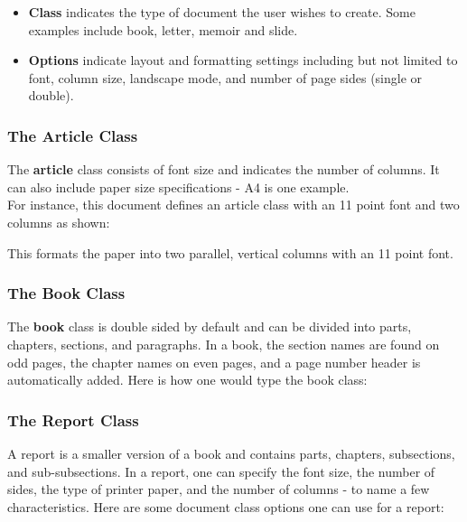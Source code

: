 \documentclass[11pt,twocolumn]{article}
\begin{document}
\begin{itemize}
    \item \textbf{Class} indicates the type of document the user wishes to create. Some examples include book, letter, memoir and slide.
    \item \textbf{Options} indicate layout and formatting settings including but not limited to font, column size, landscape mode, and number of page sides (single or double). 
\end{itemize}

\subsubsection{The Article Class}
The \textbf{article} class consists of font size and indicates the number of columns. It can also include paper size specifications - A4 is one example.~\cite{latexmanual} \\For instance, this document defines an article class with an 11 point font and two columns as shown:

\thinspace
{}
\thinspace

This formats the paper into two parallel, vertical columns with an 11 point font. 

\subsubsection{The Book Class}
The \textbf{book} class is double sided by default and can be divided into parts, chapters, sections, and paragraphs. In a book, the section names are found on odd pages, the chapter names on even pages, and a page number header is automatically added.  
Here is how one would type the book class:

\thinspace
{}
\thinspace

\subsubsection{The Report Class}
A report is a smaller version of a book and contains parts, chapters, subsections, and sub-subsections.
In a report, one can specify the font size, the number of sides, the type of printer paper, and the number of columns - to name a few characteristics. Here are some document class options one can use for a report:
\end{document}
